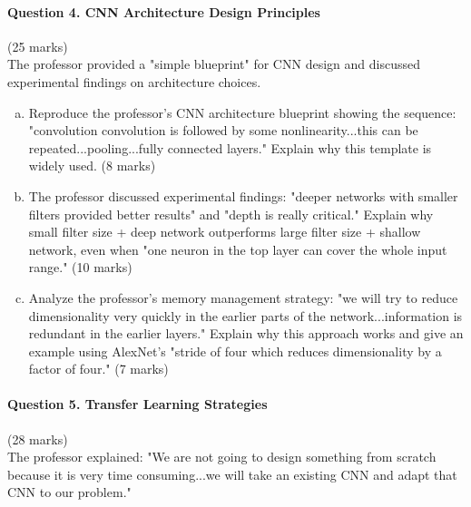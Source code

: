 \documentclass[12pt]{article}
\newcommand{\shortanswer}{\vspace{2cm}}
\newcommand{\mediumanswer}{\vspace{3cm}}
\begin{document}
\newpage
\paragraph{Question 4. CNN Architecture Design Principles}{\hfill (25 marks)}\\
The professor provided a "simple blueprint" for CNN design and discussed experimental findings on architecture choices.

\begin{enumerate}[(a)]
    \item Reproduce the professor's CNN architecture blueprint showing the sequence: "convolution convolution is followed by some nonlinearity...this can be repeated...pooling...fully connected layers." Explain why this template is widely used. \hfill (8 marks)
    
    \begin{center}
    \end{center}
    
    \shortanswer
    
    \item The professor discussed experimental findings: "deeper networks with smaller filters provided better results" and "depth is really critical." Explain why small filter size + deep network outperforms large filter size + shallow network, even when "one neuron in the top layer can cover the whole input range." \hfill (10 marks)
    
    \mediumanswer
    
    \item Analyze the professor's memory management strategy: "we will try to reduce dimensionality very quickly in the earlier parts of the network...information is redundant in the earlier layers." Explain why this approach works and give an example using AlexNet's "stride of four which reduces dimensionality by a factor of four." \hfill (7 marks)
    
    \mediumanswer
\end{enumerate}

\newpage
\paragraph{Question 5. Transfer Learning Strategies}{\hfill (28 marks)}\\
The professor explained: "We are not going to design something from scratch because it is very time consuming...we will take an existing CNN and adapt that CNN to our problem."
\end{document}
